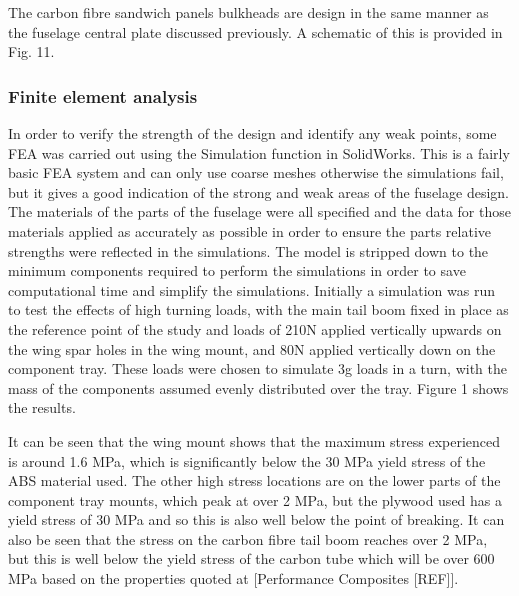 \documentclass[../../main.tex]{subfiles}
\begin{document}
The carbon fibre sandwich panels bulkheads are design in the same manner as the fuselage central plate discussed previously.
A schematic of this is provided in Fig. 11. 


\subsubsection{Finite element analysis} \label{sec:design-process:final-design-proposal:fuselage:finite-element-analysis}

In order to verify the strength of the design and identify any weak points, some FEA was carried out using the Simulation function in SolidWorks.
This is a fairly basic FEA system and can only use coarse meshes otherwise the simulations fail, but it gives a good indication of the strong and weak areas of the fuselage design.
The materials of the parts of the fuselage were all specified and the data for those materials applied as accurately as possible in order to ensure the parts relative strengths were reflected in the simulations.
The model is stripped down to the minimum components required to perform the simulations in order to save computational time and simplify the simulations.
Initially a simulation was run to test the effects of high turning loads, with the main tail boom fixed in place as the reference point of the study and loads of 210N applied vertically upwards on the wing spar holes in the wing mount, and 80N applied vertically down on the component tray.
These loads were chosen to simulate 3g loads in a turn, with the mass of the components assumed evenly distributed over the tray.
Figure 1 shows the results.


It can be seen that the wing mount shows that the maximum stress experienced is around 1.6 MPa, which is significantly below the 30 MPa yield stress of the ABS material used.
The other high stress locations are on the lower parts of the component tray mounts, which peak at over 2 MPa, but the plywood used has a yield stress of 30 MPa and so this is also well below the point of breaking.
It can also be seen that the stress on the carbon fibre tail boom reaches over 2 MPa, but this is well below the yield stress of the carbon tube which will be over 600 MPa based on the properties quoted at [Performance Composites [REF]]. 
\end{document}

